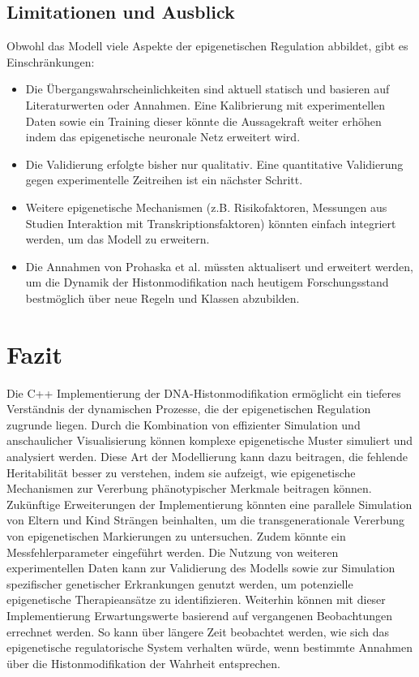 \documentclass{SeminarV2}
\begin{document}
\subsection{Limitationen und Ausblick}
Obwohl das Modell viele Aspekte der epigenetischen Regulation abbildet, gibt es Einschr\"{a}nkungen:
\begin{itemize}
    \item Die \"{U}bergangswahrscheinlichkeiten sind aktuell statisch und basieren auf Literaturwerten oder Annahmen. Eine Kalibrierung mit experimentellen Daten sowie ein Training dieser k\"{o}nnte die Aussagekraft weiter erh\"{o}hen indem das epigenetische neuronale Netz erweitert wird.
    \item Die Validierung erfolgte bisher nur qualitativ. Eine quantitative Validierung gegen experimentelle Zeitreihen ist ein n\"{a}chster Schritt.
    \item Weitere epigenetische Mechanismen (z.B. Risikofaktoren, Messungen aus Studien Interaktion mit Transkriptionsfaktoren) k\"{o}nnten einfach integriert werden, um das Modell zu erweitern.
    \item Die Annahmen von Prohaska et al. müssten aktualisert und erweitert werden, um die Dynamik der Histonmodifikation nach heutigem Forschungsstand bestmöglich über neue Regeln und Klassen abzubilden.
\end{itemize}

\section{Fazit}
Die C++ Implementierung der DNA-Histonmodifikation erm\"{o}glicht ein tieferes Verst\"{a}ndnis der dynamischen Prozesse, die der epigenetischen Regulation zugrunde liegen. Durch die Kombination von effizienter Simulation und anschaulicher Visualisierung k\"{o}nnen komplexe epigenetische Muster simuliert und analysiert werden.
Diese Art der Modellierung kann dazu beitragen, die fehlende Heritabilit\"{a}t besser zu verstehen, indem sie aufzeigt, wie epigenetische Mechanismen zur Vererbung ph\"{a}notypischer Merkmale beitragen k\"{o}nnen. 
Zuk\"{u}nftige Erweiterungen der Implementierung k\"{o}nnten eine parallele Simulation von Eltern und Kind Str\"{a}ngen beinhalten, um die transgenerationale Vererbung von epigenetischen Markierungen zu untersuchen.
Zudem könnte ein Messfehlerparameter eingeführt werden.
Die Nutzung von weiteren experimentellen Daten kann zur Validierung des Modells sowie zur Simulation spezifischer genetischer Erkrankungen genutzt werden, um potenzielle epigenetische Therapieans\"{a}tze zu identifizieren.
Weiterhin können mit dieser Implementierung Erwartungswerte basierend auf vergangenen Beobachtungen errechnet werden. So kann \"{u}ber l\"{a}ngere Zeit beobachtet werden, wie sich das epigenetische regulatorische System verhalten w\"{u}rde, wenn bestimmte Annahmen \"{u}ber die Histonmodifikation der Wahrheit entsprechen.
\newpage
\end{document}
